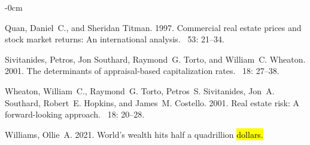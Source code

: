 \documentclass[jrfm,article,accept,oneauthor,pdftex]{Definitions/mdpi}
\begin{document}
\begin{adjustwidth}{-\extralength}{0cm}
\begin{thebibliography}{999}
Quan, Daniel~C., and Sheridan Titman. 1997.
\newblock Commercial real estate prices and stock market returns: An
  international analysis.
~{53\/}: 21--34.

Sivitanides, Petros, Jon Southard, Raymond~G. Torto, and William~C. Wheaton.
  2001.
\newblock The determinants of appraisal-based capitalization rates.
~{18\/}:  27--38.

Wheaton, William~C., Raymond~G. Torto, Petros~S. Sivitanides, Jon~A. Southard,
  Robert~E. Hopkins, and James~M. Costello. 2001.
\newblock Real estate risk: A forward-looking approach.
~{18\/}: 20--28.

Williams, Ollie~A. 2021.
\newblock World's wealth hits half a quadrillion \hl{dollars.} %


\end{thebibliography}

\end{adjustwidth}
%
\end{document}
